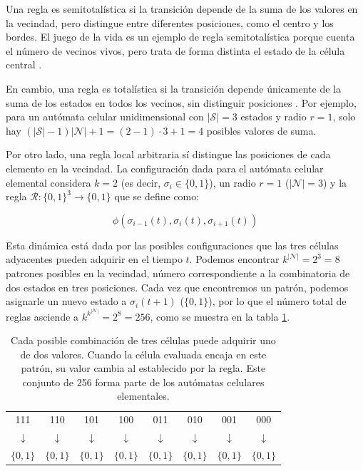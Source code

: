 Una regla es semitotalística si la transición depende de la suma de los valores en la vecindad, pero distingue entre diferentes posiciones, como el centro y los bordes. El juego de la vida es un ejemplo de regla semitotalística porque cuenta el número de vecinos vivos, pero trata de forma distinta el estado de la célula central \cite{semi_totalistic}.

En cambio, una regla es totalística si la transición depende únicamente de la suma de los estados en todos los vecinos, sin distinguir posiciones \cite{totalistic}. Por ejemplo, para un autómata celular unidimensional con $|\mathcal{S}| = 3$ estados y radio $r = 1$, solo hay $(|\mathcal{S}|-1) |\mathcal{N}|+1 = (2-1) \cdot 3 + 1 = 4$ posibles valores de suma.

Por otro lado, una regla local arbitraria sí distingue las posiciones de cada elemento en la vecindad. La configuración dada para el autómata celular elemental considera $k = 2$ (es decir, $\sigma_i \in \{0, 1\}$), un radio $r = 1$ ($|\mathcal{N}| = 3$) y la regla $\mathcal{R}: \{0,1\}^3 \rightarrow \{0,1\}$ que se define como:

\[
\phi(\sigma_{i-1}(t), \sigma_{i}(t), \sigma_{i+1}(t))
\]

Esta dinámica está dada por las posibles configuraciones que las tres células adyacentes pueden adquirir en el tiempo $t$. Podemos encontrar $k^{|\mathcal{N}|} = 2^3 = 8$ patrones posibles en la vecindad, número correspondiente a la combinatoria de dos estados en tres posiciones. Cada vez que encontremos un patrón, podemos asignarle un nuevo estado a $\sigma_i(t + 1)$ ($\{ 0, 1 \}$), por lo que el número total de reglas asciende a $k^{k^{|\mathcal{N}|}} = 2^8 = 256$, como se muestra en la tabla \ref{tab:ECA_evolucion}.

\begin{table}
	
	\centering
	
	\begin{tabular}{c c c c c c c c} 
		
		111 & 110 & 101 & 100 & 011 & 010 & 001 & 000 \\
		
		$\downarrow$ & $\downarrow$ & $\downarrow$ & $\downarrow$ & $\downarrow$ & $\downarrow$ & $\downarrow$ & $\downarrow$ \\
		
		$\{ 0, 1 \}$ & $\{ 0, 1 \}$ & $\{ 0, 1 \}$ & $\{ 0, 1 \}$ & $\{ 0, 1 \}$ & $\{ 0, 1 \}$ & $\{ 0, 1 \}$ & $\{ 0, 1 \}$ 
		
	\end{tabular}
	
	\caption{Cada posible combinación de tres células puede adquirir uno de dos valores. Cuando la célula evaluada encaja en este patrón, su valor cambia al establecido por la regla. Este conjunto de 256 forma parte de los autómatas celulares elementales.}
	
	\label{tab:ECA_evolucion}
	
\end{table}

